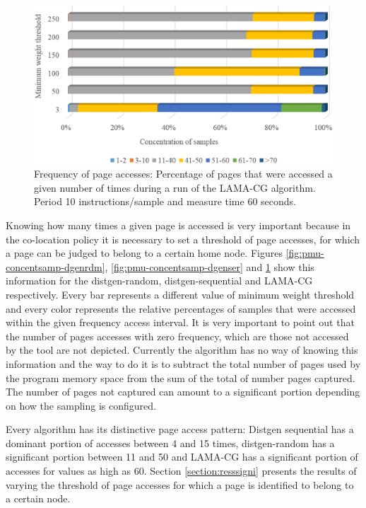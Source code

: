 \begin{figure}[th]
	\centering
		\includegraphics[width=.8\textwidth]{figures/pagetouch-dgenrdm.eps}
		\caption{Frequency of page accesses: Percentage of pages that were accessed a given number of times during a run of the LAMA-CG algorithm. Period 10 instructions/sample and measure time 60 seconds.}
		\label{fig:pmu-concentsamp-dgenlama}
\end{figure}


Knowing how many times a given page is accessed is very important because in the co-location policy it is necessary to set a threshold of page accesses, for which a page can be judged to belong to a certain home node. Figures \ref{fig:pmu-concentsamp-dgenrdm}, \ref{fig:pmu-concentsamp-dgenser} and \ref{fig:pmu-concentsamp-dgenlama} show this information for the distgen-random, distgen-sequential and LAMA-CG respectively. Every bar represents a different value of minimum weight threshold and every color represents the relative percentages of samples that were accessed within the given frequency access interval. It is very important to point out that the number of pages accesses with zero frequency, which are those not accessed by the tool are not depicted. Currently the algorithm has no way of knowing this information and the way to do it is to subtract the total number of pages used by the program memory space from the sum of the total of number pages captured. The number of pages not captured can amount to a significant portion depending on how the sampling is configured.

Every algorithm has its distinctive page access pattern: Distgen sequential has a dominant portion of accesses between 4 and 15 times, distgen-random has a significant portion between 11 and 50 and LAMA-CG has a significant portion of accesses for values as high as 60. Section \ref{section:resssigni} presents the results of varying the threshold of page accesses for which a page is identified to belong to a certain node.

